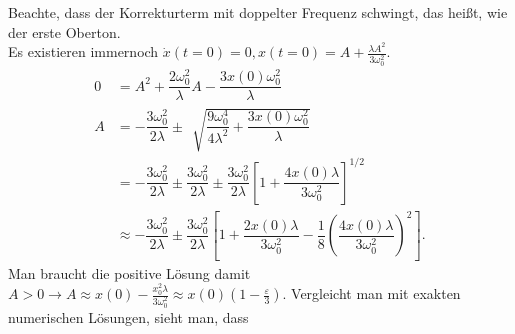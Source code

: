 \documentclass[a4paper,12pt]{article}
\numberwithin{equation}{section}
\begin{document}
Beachte, dass der Korrekturterm mit doppelter Frequenz schwingt, das heißt, wie der erste Oberton.\\\indent
Es existieren immernoch $\dot{x}\left(t=0\right)=0,x\left(t=0\right)=A+\tfrac{\lambda A^2}{3\omega _0^2}$.
\begin{align} 
        0&=A^2+\dfrac{2\omega _0^2}{\lambda }A-\dfrac{3x\left(0\right)\omega _0^2}{\lambda }\nonumber \\
        A&=-\dfrac{3\omega _0^2}{2\lambda }\pm\,\sqrt[]{\dfrac{9\omega _0^4}{4\lambda ^2}+\dfrac{3x\left(0\right)\omega _0^2}{\lambda }}\nonumber \\
         &=-\dfrac{3\omega _0^2}{2\lambda }\pm\dfrac{3\omega _0^2}{2\lambda }\pm \dfrac{3\omega _0^2}{2\lambda }\left[1+\dfrac{4x\left(0\right)\lambda }{3\omega _0^2}\right]^{1/2}\nonumber \\
         &\approx -\dfrac{3\omega _0^2}{2\lambda }\pm\dfrac{3\omega _0^2}{2\lambda }\left[1+\dfrac{2x\left(0\right)\lambda }{3\omega _0^2}-\dfrac{1}{8}\left(\dfrac{4x\left(0\right)\lambda }{3\omega _0^2}\right)^2\right]\label{eq:9.23}
.\end{align} 
Man braucht die positive Lösung damit $A>0\rightarrow A\approx x\left(0\right)-\tfrac{x_0^2\lambda }{3\omega _0^2}\approx x\left(0\right)\left(1-\tfrac{\varepsilon }{3}\right)$. Vergleicht man mit exakten numerischen Lösungen, sieht man, dass
\end{document}

